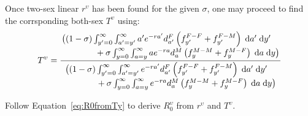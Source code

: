  \FloatBarrier
\label{sec:2sexlinearother}
Once two-sex linear $r^\upsilon$ has been found for the given $\sigma$, one may
proceed to find the corrsponding both-sex $T^\upsilon$ using:
\begin{equation}
T^\upsilon = \frac{\splitfrac{
   \big((1 - \sigma)  \int _{y'=0}^\infty \int_{a'=y'}^\infty 
       a'e^{-ra'} d_{a'}^F \left( f_{y'}^{F-F} + f_{y'}^{F-M} \right) \dd a'\dd
       y'}{ + \sigma \int_{y=0}^\infty \int _{a=y}^\infty a e^{-ra}d_{a}^M 
       \left( f_{y}^{M-M}+ f_{y}^{M-F} \right) \dd a \dd y \big)}}{\splitfrac{\big( (1 - \sigma) 
   \int_{y'=0}^\infty \int_{a'=y'}^\infty e^{-ra'} d_{a'}^F \left( f_{y'}^{F-F}
   + f_{y'}^{F-M} \right) \dd a'\dd y'}{ +\sigma \int _{y=0}^\infty
   \int_{a=y}^\infty e^{-ra} d_{a}^M \left( f_{y}^{M-M} + f_{y}^{M-F} \right)
   \dd a \dd y \big)}}
\end{equation}

Follow Equation~\eqref{eq:R0fromTy} to derive $R_0^\upsilon$ from $r^\upsilon$
and $T^\upsilon$. 

